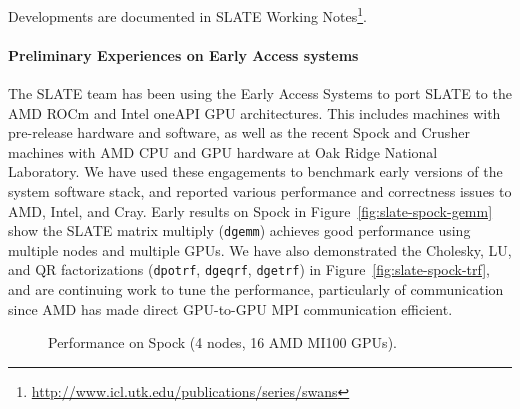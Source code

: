 \noindent
Developments are documented in SLATE Working Notes\footnote{
\url{http://www.icl.utk.edu/publications/series/swans}}.

\paragraph{Preliminary Experiences on Early Access systems}

The SLATE team has been using the Early Access Systems to port SLATE to
the AMD ROCm and Intel oneAPI GPU architectures. This includes machines
with pre-release hardware and software, as well as the recent Spock and
Crusher machines with AMD CPU and GPU hardware at Oak Ridge National
Laboratory. We have used these engagements to benchmark early versions
of the system software stack, and reported various performance and
correctness issues to AMD, Intel, and Cray. Early results on Spock in
Figure~\ref{fig:slate-spock-gemm} show the SLATE matrix multiply
(\verb+dgemm+) achieves good performance using multiple nodes and
multiple GPUs. We have also demonstrated the Cholesky, LU, and QR
factorizations (\verb+dpotrf+, \verb+dgeqrf+, \verb+dgetrf+) in
Figure~\ref{fig:slate-spock-trf}, and are continuing work to tune the
performance, particularly of communication since AMD has made direct
GPU-to-GPU MPI communication efficient.

\begin{figure}
    \centering
    \caption{Performance on Spock (4 nodes, 16 AMD MI100 GPUs).}
\end{figure}

